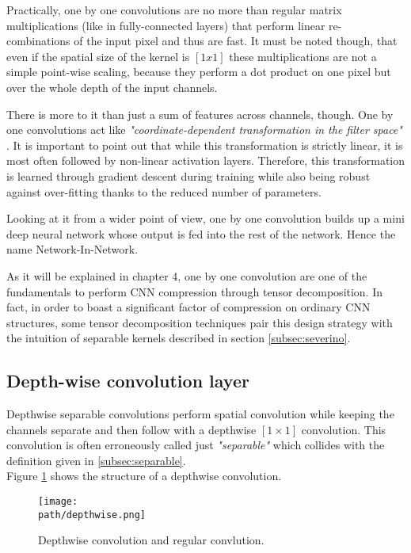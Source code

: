 Practically, one by one convolutions are no more than regular matrix multiplications (like in fully-connected layers) that perform linear re-combinations of the input pixel and thus are fast. It must be noted though, that even if the spatial size of the kernel is $[1x1]$ these multiplications are not a simple point-wise scaling, because they perform a dot product on one pixel but over the whole depth of the input channels. 
\newline 

There is more to it than just a sum of features across channels, though. One by one convolutions act like \emph{"coordinate-dependent transformation in the filter space"} \parencite{NIN}. It is important to point out that while this transformation is strictly linear, it is most often followed by non-linear activation layers. Therefore, this transformation is learned through gradient descent during training while also being robust against over-fitting thanks to the reduced number of parameters. 
\newline 

Looking at it from a wider point of view, one by one convolution builds up a mini deep neural network whose output is fed into the rest of the network. Hence the name Network-In-Network. 
\newline

As it will be explained in chapter 4, one by one convolution are one of the fundamentals to perform CNN compression through tensor decomposition. In fact, in order to boast a significant factor of compression on ordinary CNN structures, some tensor decomposition techniques pair this design strategy with the intuition of separable kernels described in section \ref{subsec:severino}.

\subsection{Depth-wise convolution layer}
\label{subsec:depthwise}
Depthwise separable convolutions perform spatial convolution while keeping the channels separate and then follow with a depthwise $[1 \times 1]$ convolution. This convolution is often erroneously called just \emph{"separable"} which collides with the definition given in \ref{subsec:separable}. 
\\

Figure \ref{fig:depthwise} shows the structure of a depthwise convolution. 

\begin{figure}[h!]
 \centering
 \texttt{[image: \\path/depthwise.png]} 
 \caption{Depthwise convolution and regular convlution.}
 \label{fig:depthwise}
\end{figure}


